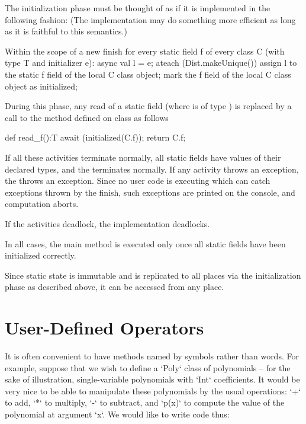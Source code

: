 The initialization phase must be thought of as if it is implemented in
the following fashion: (The implementation may do something more
efficient as long as it is faithful to this semantics.)

\begin{xten}
Within the scope of a new finish
for every static field f of every class C 
   (with type T and initializer e):
async {
  val l = e; 
  ateach (Dist.makeUnique()) {
     assign l to the static f field of 
         the local C class object;
     mark the f field of the local C 
         class object as initialized;
  }
}
\end{xten}

During this phase, any read of a static field  (where  is of type )
is replaced by a call to the method  defined on class 
as follows

\begin{xten}
def read_f():T {
   await (initialized(C.f));
   return C.f;
}
\end{xten}
 

If all these activities terminate normally, all static fields have values of
their declared types, 
and the  terminates normally. If
any activity throws an exception, the  throws an
exception. Since no user code is executing which can catch exceptions
thrown by the finish, such exceptions are printed on the console, and
computation aborts.

If the activities deadlock, the implementation deadlocks.

In all cases, the main method is executed only once all static fields
have been initialized correctly.

Since static state is immutable and is replicated to all places via 
the initialization phase as described above, it can be accessed from
any place.



\section{User-Defined Operators}

It is often convenient to have methods named by symbols rather than words.
For example, suppose that we wish to define a \xcd`Poly` class of
polynomials -- for the sake of illustration, single-variable polynomials with
\xcd`Int` coefficients.  It would be very nice to be able to manipulate these
polynomials by the usual operations: \xcd`+` to add, \xcd`*` to multiply,
\xcd`-` to subtract, and \xcd`p(x)` to compute the value of the polynomial at
argument \xcd`x`.  We would like to write code thus: 

